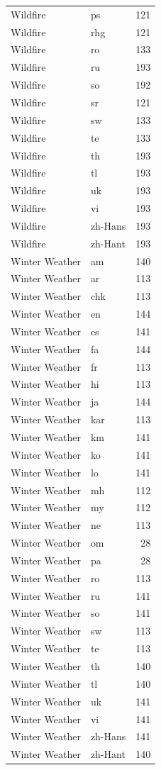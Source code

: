 \begin{longtable}{p{3cm} p{3cm} r}
Wildfire & ps & 121 \\
Wildfire & rhg & 121 \\
Wildfire & ro & 133 \\
Wildfire & ru & 193 \\
Wildfire & so & 192 \\
Wildfire & sr & 121 \\
Wildfire & sw & 133 \\
Wildfire & te & 133 \\
Wildfire & th & 193 \\
Wildfire & tl & 193 \\
Wildfire & uk & 193 \\
Wildfire & vi & 193 \\
Wildfire & zh-Hans & 193 \\
Wildfire & zh-Hant & 193 \\
Winter Weather & am & 140 \\
Winter Weather & ar & 113 \\
Winter Weather & chk & 113 \\
Winter Weather & en & 144 \\
Winter Weather & es & 141 \\
Winter Weather & fa & 144 \\
Winter Weather & fr & 113 \\
Winter Weather & hi & 113 \\
Winter Weather & ja & 144 \\
Winter Weather & kar & 113 \\
Winter Weather & km & 141 \\
Winter Weather & ko & 141 \\
Winter Weather & lo & 141 \\
Winter Weather & mh & 112 \\
Winter Weather & my & 112 \\
Winter Weather & ne & 113 \\
Winter Weather & om & 28 \\
Winter Weather & pa & 28 \\
Winter Weather & ro & 113 \\
Winter Weather & ru & 141 \\
Winter Weather & so & 141 \\
Winter Weather & sw & 113 \\
Winter Weather & te & 113 \\
Winter Weather & th & 140 \\
Winter Weather & tl & 140 \\
Winter Weather & uk & 141 \\
Winter Weather & vi & 141 \\
Winter Weather & zh-Hans & 141 \\
Winter Weather & zh-Hant & 140 \\
\end{longtable}